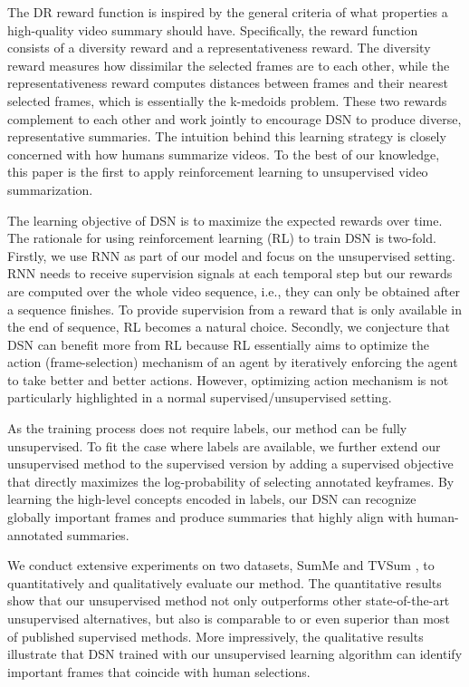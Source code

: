\documentclass[letterpaper]{article} \usepackage{aaai18}  \usepackage{times}  \usepackage{helvet}  \usepackage{courier}  \usepackage{url}  \usepackage{graphicx}
\begin{document}
The DR reward function is inspired by the general criteria of what properties a high-quality video summary should have. Specifically, the reward function consists of a diversity reward and a representativeness reward. The diversity reward measures how dissimilar the selected frames are to each other, while the representativeness reward computes distances between frames and their nearest selected frames, which is essentially the k-medoids problem. These two rewards complement to each other and work jointly to encourage DSN to produce diverse, representative summaries. The intuition behind this learning strategy is closely concerned with how humans summarize videos. To the best of our knowledge, this paper is the first to apply reinforcement learning to unsupervised video summarization.

The learning objective of DSN is to maximize the expected rewards over time. The rationale for using reinforcement learning (RL) to train DSN is two-fold. Firstly, we use RNN as part of our model and focus on the unsupervised setting. RNN needs to receive supervision signals at each temporal step but our rewards are computed over the whole video sequence, i.e., they can only be obtained after a sequence finishes. To provide supervision from a reward that is only available in the end of sequence, RL becomes a natural choice. Secondly,  we conjecture that DSN can benefit more from RL because RL essentially aims to optimize the action (frame-selection) mechanism of an agent by iteratively enforcing the agent to take better and better actions. However, optimizing action mechanism is not particularly highlighted in a normal supervised/unsupervised setting.

As the training process does not require labels, our method can be fully unsupervised. To fit the case where labels are available, we further extend our unsupervised method to the supervised version by adding a supervised objective that directly maximizes the log-probability of selecting annotated keyframes. By learning the high-level concepts encoded in labels, our DSN can recognize globally important frames and produce summaries that highly align with human-annotated summaries.

We conduct extensive experiments on two datasets, SumMe \cite{gygli2014creating} and TVSum \cite{song2015tvsum}, to quantitatively and qualitatively evaluate our method. The quantitative results show that our unsupervised method not only outperforms other state-of-the-art unsupervised alternatives, but also is comparable to or even superior than most of published supervised methods. More impressively, the qualitative results illustrate that DSN trained with our unsupervised learning algorithm can identify important frames that coincide with human selections.
\end{document}

